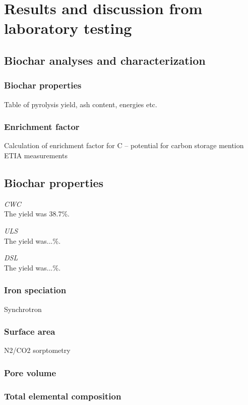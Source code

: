 \chapter{Results and discussion from laboratory testing}\label{chap:Results&Disc}

\section{Biochar analyses and characterization}

\subsection{Biochar properties}
Table of pyrolysis yield, ash content, energies etc. 

\subsection{Enrichment factor}
Calculation of enrichment factor for C – potential for carbon storage
mention ETIA measurements

\section{Biochar properties}

\textit{CWC}\\
The yield was 38.7\%. 

\textit{ULS}\\
The yield was...\%.

\textit{DSL}\\
The yield was...\%.

\subsection{Iron speciation}
Synchrotron

\subsection{Surface area}
N2/CO2 sorptometry

\subsection{Pore volume}

\subsection{Total elemental composition}

